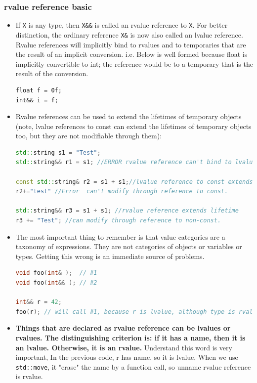 \documentclass[a4paper,11pt,twoside]{book}
\begin{document}
\subsubsection{rvalue reference basic}
\begin{itemize}
	\item If \texttt{X} is any type, then \texttt{X\&\&} is called an rvalue reference to \texttt{X}. For better distinction, the ordinary reference \texttt{X\&} is now also called an lvalue reference. Rvalue references will implicitly bind to rvalues and to temporaries that are the result of an implicit conversion. i.e. Below is well formed because float is implicitly convertible to int; the reference would be to a temporary that is the result of the conversion.
\begin{lstlisting}
float f = 0f; 
int&& i = f; 
\end{lstlisting}
	
	\item Rvalue references can be used to extend the lifetimes of temporary objects (note, lvalue references to const can extend the lifetimes of temporary objects too, but they are not modifiable through them):
	
\begin{lstlisting}[frame=single, language=c++, mathescape=true]
std::string s1 = "Test";
std::string&& r1 = s1; //ERROR rvalue reference can't bind to lvalue.
		
const std::string& r2 = s1 + s1;//lvalue reference to const extends lifetime. 
r2+="test" //Error  can't modify through reference to const.
		
std::string&& r3 = s1 + s1; //rvalue reference extends lifetime
r3 += "Test"; //can modify through reference to non-const.                   
\end{lstlisting}
	

	\item The most important thing to remember is that value categories are a taxonomy of expressions. They are not categories of objects or variables or types. Getting this wrong is an immediate source of problems. 
\begin{lstlisting}[frame=single, language=c++, mathescape=true]
void foo(int& );  // #1
void foo(int&& ); // #2

int&& r = 42;
foo(r); // will call #1, because r is lvalue, although type is rvalue reference.
\end{lstlisting} 

\item \textbf{Things that are declared as rvalue reference can be lvalues or rvalues. The distinguishing criterion is: if it has a name, then it is an lvalue. Otherwise, it is an rvalue.} Understand this word is very important, In the previous code, r has name, so it is lvalue, When we use \texttt{std::move}, it "erase" the name by a function call, so unname rvalue reference is rvalue.
	
\end{itemize}
\end{document}
